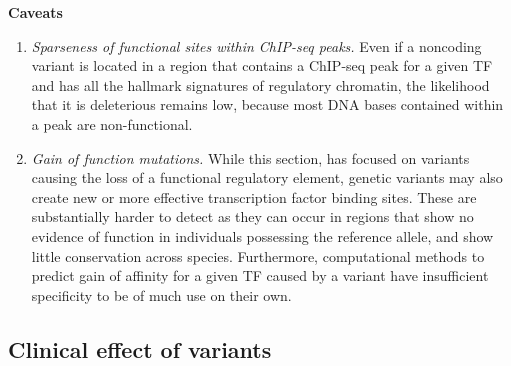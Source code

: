 \textbf{Caveats}
	\begin{enumerate}[label=\roman*]
	
	\item \textit{Sparseness of functional sites within ChIP-seq peaks.} Even if a noncoding variant is located in a region that contains a ChIP-seq peak for a given TF and has all the hallmark signatures of regulatory chromatin, the likelihood that it is deleterious remains low, because most DNA bases contained within a peak are non-functional. 
	
	\item \textit{Gain of function mutations.} While this section, has focused on variants causing the loss of a functional regulatory element, genetic variants may also create new or more effective transcription factor binding sites. These are substantially harder to detect as they can occur in regions that show no evidence of function in individuals possessing the reference allele, and show little conservation across species. Furthermore, computational methods to predict gain of affinity for a given TF caused by a variant have insufficient specificity to be of much use on their own. 
	
	\end{enumerate}

\subsection{Clinical effect of variants}

